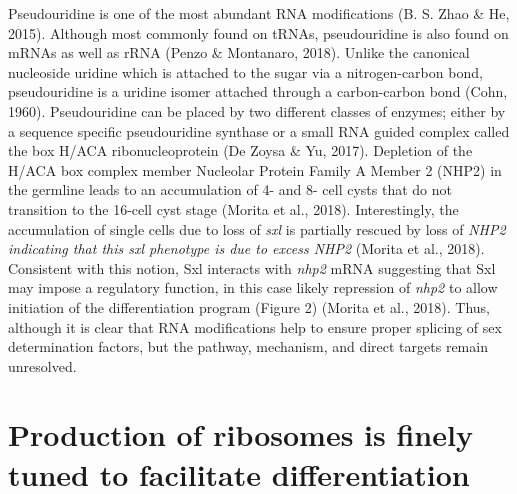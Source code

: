 \documentclass[12pt,oneside]{reedthesis}
\begin{document}
Pseudouridine is one of the most abundant RNA modifications
(B. S. Zhao \& He, 2015). Although most commonly found on tRNAs, pseudouridine is
also found on mRNAs as well as rRNA (Penzo \& Montanaro, 2018). Unlike the
canonical nucleoside uridine which is attached to the sugar via a
nitrogen-carbon bond, pseudouridine is a uridine isomer attached through
a carbon-carbon bond (Cohn, 1960). Pseudouridine can be placed by two
different classes of enzymes; either by a sequence specific
pseudouridine synthase or a small RNA guided complex called the box
H/ACA ribonucleoprotein (De Zoysa \& Yu, 2017). Depletion of the H/ACA box
complex member Nucleolar Protein Family A Member 2 (NHP2) in the
germline leads to an accumulation of 4- and 8- cell cysts that do not
transition to the 16-cell cyst stage (Morita et al., 2018). Interestingly,
the accumulation of single cells due to loss of \emph{sxl} is partially
rescued by loss of \emph{NHP2 indicating that this sxl phenotype is due to
excess NHP2} (Morita et al., 2018). Consistent with this notion, Sxl
interacts with \emph{nhp2} mRNA suggesting that Sxl may impose a regulatory
function, in this case likely repression of \emph{nhp2} to allow initiation
of the differentiation program (Figure 2) (Morita et al., 2018). Thus,
although it is clear that RNA modifications help to ensure proper
splicing of sex determination factors, but the pathway, mechanism, and
direct targets remain unresolved.

\hypertarget{production-of-ribosomes-is-finely-tuned-to-facilitate-differentiation}{%
\section{Production of ribosomes is finely tuned to facilitate differentiation}\label{production-of-ribosomes-is-finely-tuned-to-facilitate-differentiation}}
\end{document}
